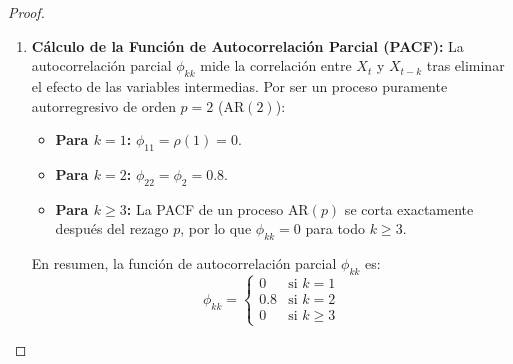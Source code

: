 \documentclass[11pt,letterpaper]{article}
\begin{document}
\begin{proof}
\begin{enumerate}
    \item \textbf{Cálculo de la Función de Autocorrelación Parcial (PACF):}
    La autocorrelación parcial $\phi_{kk}$ mide la correlación entre $X_t$ y $X_{t-k}$ tras eliminar el efecto de las variables intermedias. Por ser un proceso puramente autorregresivo de orden $p = 2$ ($\text{AR}(2)$):
    \begin{itemize}
        \item \textbf{Para $k = 1$:} $\phi_{11} = \rho(1) = 0$.
        \item \textbf{Para $k = 2$:} $\phi_{22} = \phi_2 = 0.8$.
        \item \textbf{Para $k \ge 3$:} La PACF de un proceso $\text{AR}(p)$ se corta exactamente después del rezago $p$, por lo que $\phi_{kk} = 0$ para todo $k \ge 3$.
    \end{itemize}
    En resumen, la función de autocorrelación parcial $\phi_{kk}$ es:
    \[
    \phi_{kk} = 
    \begin{cases} 
    0 & \text{si } k = 1 \\ 
    0.8 & \text{si } k = 2 \\ 
    0 & \text{si } k \ge 3 
    \end{cases}
    \]
\end{enumerate}
\end{proof}
\end{document}

